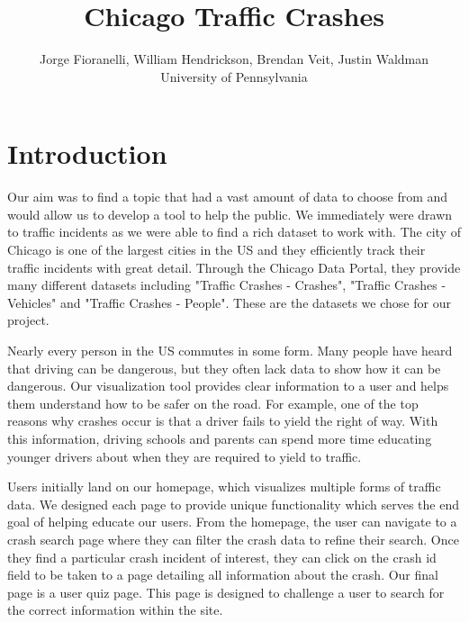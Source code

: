 \documentclass[12pt]{article}
\title{\textbf{Chicago Traffic Crashes}}
\author{Jorge Fioranelli, William Hendrickson, Brendan Veit, Justin Waldman \\ University of Pennsylvania}
\begin{document}
\maketitle

\section{Introduction}
Our aim was to find a topic that had a vast amount of data to choose from and would allow us to develop a tool to help the public. We immediately were drawn to traffic incidents as we were able to find a rich dataset to work with. The city of Chicago is one of the largest cities in the US and they efficiently track their traffic incidents with great detail. Through the Chicago Data Portal, they provide many different datasets including "Traffic Crashes - Crashes", "Traffic Crashes - Vehicles" and "Traffic Crashes - People". These are the datasets we chose for our project. 


Nearly every person in the US commutes in some form. Many people have heard that driving can be dangerous, but they often lack data to show how it can be dangerous. Our visualization tool provides clear information to a user and helps them understand how to be safer on the road. For example, one of the top reasons why crashes occur is that a driver fails to yield the right of way. With this information, driving schools and parents can spend more time educating younger drivers about when they are required to yield to traffic.


Users initially land on our homepage, which visualizes multiple forms of traffic data. We designed each page to provide unique functionality which serves the end goal of helping educate our users. From the homepage, the user can navigate to a crash search page where they can filter the crash data to refine their search. Once they find a particular crash incident of interest, they can click on the crash id field to be taken to a page detailing all information about the crash. Our final page is a user quiz page. This page is designed to challenge a user to search for the correct information within the site. 
\end{document}
